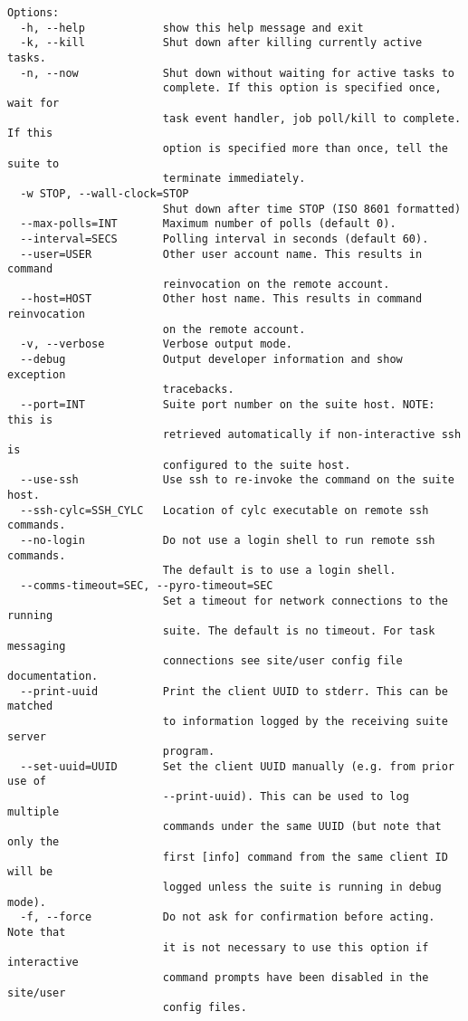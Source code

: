 \begin{lstlisting}
Options:
  -h, --help            show this help message and exit
  -k, --kill            Shut down after killing currently active tasks.
  -n, --now             Shut down without waiting for active tasks to
                        complete. If this option is specified once, wait for
                        task event handler, job poll/kill to complete. If this
                        option is specified more than once, tell the suite to
                        terminate immediately.
  -w STOP, --wall-clock=STOP
                        Shut down after time STOP (ISO 8601 formatted)
  --max-polls=INT       Maximum number of polls (default 0).
  --interval=SECS       Polling interval in seconds (default 60).
  --user=USER           Other user account name. This results in command
                        reinvocation on the remote account.
  --host=HOST           Other host name. This results in command reinvocation
                        on the remote account.
  -v, --verbose         Verbose output mode.
  --debug               Output developer information and show exception
                        tracebacks.
  --port=INT            Suite port number on the suite host. NOTE: this is
                        retrieved automatically if non-interactive ssh is
                        configured to the suite host.
  --use-ssh             Use ssh to re-invoke the command on the suite host.
  --ssh-cylc=SSH_CYLC   Location of cylc executable on remote ssh commands.
  --no-login            Do not use a login shell to run remote ssh commands.
                        The default is to use a login shell.
  --comms-timeout=SEC, --pyro-timeout=SEC
                        Set a timeout for network connections to the running
                        suite. The default is no timeout. For task messaging
                        connections see site/user config file documentation.
  --print-uuid          Print the client UUID to stderr. This can be matched
                        to information logged by the receiving suite server
                        program.
  --set-uuid=UUID       Set the client UUID manually (e.g. from prior use of
                        --print-uuid). This can be used to log multiple
                        commands under the same UUID (but note that only the
                        first [info] command from the same client ID will be
                        logged unless the suite is running in debug mode).
  -f, --force           Do not ask for confirmation before acting. Note that
                        it is not necessary to use this option if interactive
                        command prompts have been disabled in the site/user
                        config files.
\end{lstlisting}
